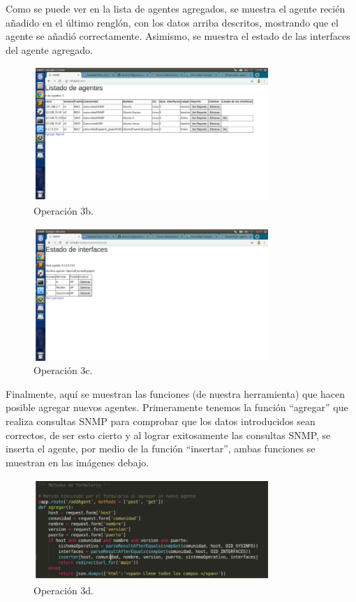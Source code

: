 \noindent 
Como se puede ver en la lista de agentes agregados, se muestra el agente recién añadido en el último renglón, con los datos arriba descritos, mostrando que el agente se añadió correctamente. Asimismo, se muestra el estado de las interfaces del agente agregado.  

\begin{figure}[htbp!]
	\centering
		\includegraphics[width=0.8\textwidth]{images/tarea3/op3b}
	\caption{Operación 3b.}
\end{figure}

\begin{figure}[htbp!]
	\centering
		\includegraphics[width=0.8\textwidth]{images/tarea3/op3c}
	\caption{Operación 3c.}
\end{figure}

\noindent
Finalmente, aquí se muestran las funciones (de nuestra herramienta) que hacen posible agregar nuevos agentes. Primeramente tenemos la función “agregar” que realiza consultas SNMP para comprobar que los datos introducidos sean correctos, de ser esto cierto y al lograr exitosamente las consultas SNMP, se inserta el agente, por medio de la función “insertar”, ambas funciones se muestran en las imágenes debajo.

\begin{figure}[htbp!]
	\centering
		\includegraphics[width=0.8\textwidth]{images/tarea3/op3d}
	\caption{Operación 3d.}
\end{figure}

